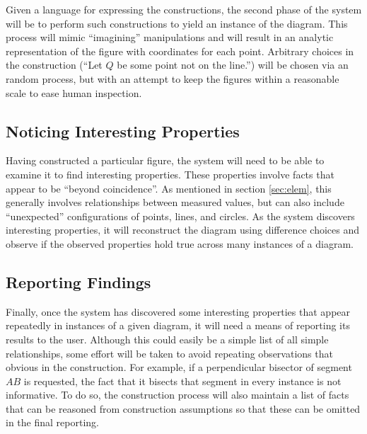 Given a language for expressing the constructions, the second phase of
the system will be to perform such constructions to yield an instance
of the diagram.  This process will mimic ``imagining'' manipulations
and will result in an analytic representation of the figure with
coordinates for each point.  Arbitrary choices in the construction
(``Let $Q$ be some point not on the line.'') will be chosen via an
random process, but with an attempt to keep the figures within a
reasonable scale to ease human inspection.

\subsection{Noticing Interesting Properties}
\label{sec:interest}

Having constructed a particular figure, the system will need to be
able to examine it to find interesting properties.  These properties
involve facts that appear to be ``beyond coincidence''.  As mentioned
in section \ref{sec:elem}, this generally involves relationships
between measured values, but can also include ``unexpected''
configurations of points, lines, and circles.  As the system discovers
interesting properties, it will reconstruct the diagram using
difference choices and observe if the observed properties hold true
across many instances of a diagram.

\subsection{Reporting Findings}

Finally, once the system has discovered some interesting properties
that appear repeatedly in instances of a given diagram, it will need a
means of reporting its results to the user.  Although this could
easily be a simple list of all simple relationships, some effort will
be taken to avoid repeating observations that obvious in the
construction.  For example, if a perpendicular bisector of segment
$AB$ is requested, the fact that it bisects that segment in every
instance is not informative.  To do so, the construction process will
also maintain a list of facts that can be reasoned from construction
assumptions so that these can be omitted in the final reporting.
